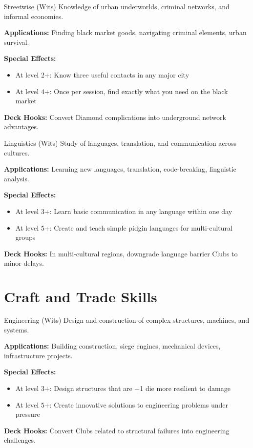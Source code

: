 \documentclass[11pt]{report}
\begin{document}
\begin{skillbox}{Streetwise (Wits)}
Knowledge of urban underworlds, criminal networks, and informal economies.

\textbf{Applications:} Finding black market goods, navigating criminal elements, urban survival.

\textbf{Special Effects:}
\begin{itemize}
    \item At level 2+: Know three useful contacts in any major city
    \item At level 4+: Once per session, find exactly what you need on the black market
\end{itemize}

\textbf{Deck Hooks:} Convert Diamond complications into underground network advantages.
\end{skillbox}

\begin{skillbox}{Linguistics (Wits)}
Study of languages, translation, and communication across cultures.

\textbf{Applications:} Learning new languages, translation, code-breaking, linguistic analysis.

\textbf{Special Effects:}
\begin{itemize}
    \item At level 3+: Learn basic communication in any language within one day
    \item At level 5+: Create and teach simple pidgin languages for multi-cultural groups
\end{itemize}

\textbf{Deck Hooks:} In multi-cultural regions, downgrade language barrier Clubs to minor delays.
\end{skillbox}

\section{Craft and Trade Skills}

\begin{skillbox}{Engineering (Wits)}
Design and construction of complex structures, machines, and systems.

\textbf{Applications:} Building construction, siege engines, mechanical devices, infrastructure projects.

\textbf{Special Effects:}
\begin{itemize}
    \item At level 3+: Design structures that are +1 die more resilient to damage
    \item At level 5+: Create innovative solutions to engineering problems under pressure
\end{itemize}

\textbf{Deck Hooks:} Convert Clubs related to structural failures into engineering challenges.
\end{skillbox}
\end{document}
